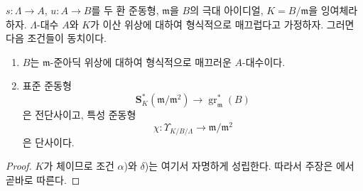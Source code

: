 \begin{corollary}[22.1.2]
\label{0.22.1.2-ko}
$s:\Lambda\to A$, $u:A\to B$를 두 환 준동형, $\mathfrak m$을 $B$의
극대 아이디얼, $K=B/\mathfrak m$을 잉여체라 하자. $\Lambda$-대수
$A$와 $K$가 이산 위상에 대하여 형식적으로 매끄럽다고 가정하자.
그러면 다음 조건들이 동치이다.
\begin{enumerate}
  \item[a)] $B$는 $\mathfrak m$-준아딕 위상에 대하여 형식적으로
  매끄러운 $A$-대수이다.
  \item[b)] 표준 준동형
  \begin{equation}
  \tag{22.1.2.1}
  \label{0.22.1.2.1-ko}
    \mathbf S_K^*(\mathfrak m/\mathfrak m^2)
    \longrightarrow\operatorname{gr}_{\mathfrak m}^*(B)
  \end{equation}
  은 전단사이고, 특성 준동형
  \begin{equation}
  \tag{22.1.2.2}
  \label{0.22.1.2.2-ko}
    \chi:\Upsilon_{K/B/\Lambda}\longrightarrow\mathfrak m/\mathfrak m^2
  \end{equation}
  은 단사이다.
\end{enumerate}
\end{corollary}

\begin{proof}
$K$가 체이므로 조건 $\alpha$)와 $\delta$)는 여기서 자명하게 성립한다.
따라서 주장은 에서 곧바로 따른다.
\end{proof}

